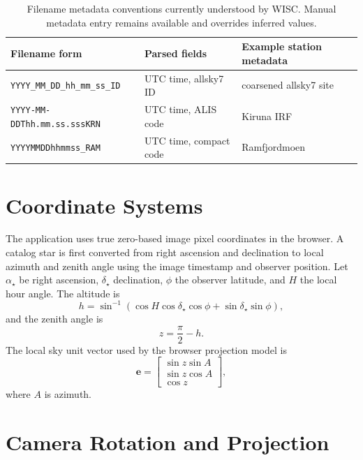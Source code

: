 \documentclass[11pt]{article}
\begin{document}
\begin{table}[h]
\centering
\begin{tabular}{lll}
\toprule
Filename form & Parsed fields & Example station metadata \\
\midrule
\texttt{YYYY\_MM\_DD\_hh\_mm\_ss\_ID} & UTC time, allsky7 ID & coarsened allsky7 site \\
\texttt{YYYY-MM-DDThh.mm.ss.sssKRN} & UTC time, ALIS code & Kiruna IRF \\
\texttt{YYYYMMDDhhmmss\_RAM} & UTC time, compact code & Ramfjordmoen \\
\bottomrule
\end{tabular}
\caption{Filename metadata conventions currently understood by WISC. Manual
metadata entry remains available and overrides inferred values.}
\label{tab:metadata-inference}
\end{table}

\section{Coordinate Systems}

The application uses true zero-based image pixel coordinates in the browser. A
catalog star is first converted from right ascension and declination to local
azimuth and zenith angle using the image timestamp and observer position. Let
\(\alpha_\star\) be right ascension, \(\delta_\star\) declination, \(\phi\) the
observer latitude, and \(H\) the local hour angle. The altitude is
\begin{equation}
  h = \sin^{-1}\left(\cos H \cos\delta_\star \cos\phi
      + \sin\delta_\star \sin\phi\right),
\end{equation}
and the zenith angle is
\begin{equation}
  z = \frac{\pi}{2} - h.
\end{equation}
The local sky unit vector used by the browser projection model is
\begin{equation}
  \mathbf{e} =
  \begin{bmatrix}
    \sin z \sin A \\
    \sin z \cos A \\
    \cos z
  \end{bmatrix},
\end{equation}
where \(A\) is azimuth.

\section{Camera Rotation and Projection}
\end{document}
